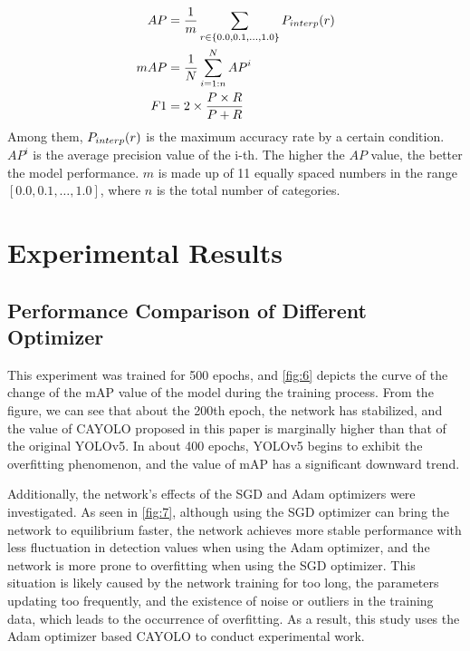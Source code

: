 \documentclass[sensors,article,submit,moreauthors]{Definitions/mdpi}
\begin{document}
    \begin{align}
        AP &= \frac{1}{m} \sum_{r \in \{0.0, 0.1, \ldots, 1.0\}} P_{\mathnormal{interp}}(r) \\
        mAP &= \frac{1}{N} \sum_{i=1:n}^{N} {AP}^i \\
        F1 &= 2 \times \frac{P \times R}{P+R}
    \end{align}
    Among them, $P_{\mathnormal{interp}}(r)$ is the maximum accuracy rate by a certain condition. ${AP^i}$ is the average precision value of the i-th. The higher the $AP$ value, the better the model performance. $m$ is made up of 11 equally spaced numbers in the range $[0.0,0.1, \ldots, 1.0]$, where $n$ is the total number of categories.




    \section{Experimental Results}

    \subsection{Performance Comparison of Different Optimizer}

    This experiment was trained for 500 epochs, and \autoref{fig:6} depicts the curve of the change of the mAP value of the model during the training process. From the figure, we can see that about the 200th epoch, the network has stabilized, and the value of CAYOLO proposed in this paper is marginally higher than that of the original YOLOv5. In about 400 epochs, YOLOv5 begins to exhibit the overfitting phenomenon, and the value of mAP has a significant downward trend.

    Additionally, the network's effects of the SGD and Adam optimizers were investigated. As seen in \autoref{fig:7}, although using the SGD optimizer can bring the network to equilibrium faster, the network achieves more stable performance with less fluctuation in detection values when using the Adam optimizer, and the network is more prone to overfitting when using the SGD optimizer. This situation is likely caused by the network training for too long, the parameters updating too frequently, and the existence of noise or outliers in the training data, which leads to the occurrence of overfitting. As a result, this study uses the Adam optimizer based CAYOLO to conduct experimental work.
\end{document}

